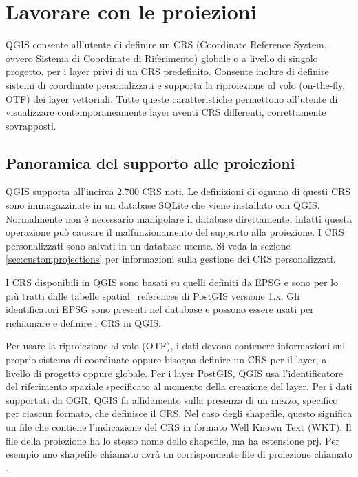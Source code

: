 
\chapter{Lavorare con le proiezioni}\label{label_projections}


QGIS consente all'utente di definire un CRS (Coordinate Reference System, ovvero Sistema di Coordinate di Riferimento) 
globale o a livello di singolo progetto, per i layer privi di un CRS predefinito. Consente inoltre di definire sistemi 
di coordinate personalizzati e supporta la riproiezione al volo (on-the-fly, OTF) dei layer vettoriali. Tutte queste 
caratteristiche permettono all'utente di visualizzare contemporaneamente layer aventi CRS differenti, correttamente 
sovrapposti.

\section{Panoramica del supporto alle proiezioni}\label{label_projoverview}

QGIS supporta all'incirca 2.700 CRS noti. Le definizioni di ognuno di questi CRS sono immagazzinate in un database SQLite 
che viene installato con QGIS. Normalmente non è necessario manipolare il database direttamente, infatti questa operazione 
può causare il malfunzionamento del supporto alla proiezione. I CRS personalizzati sono salvati in un database utente.
Si veda la sezione \ref{sec:customprojections} per informazioni sulla gestione dei CRS personalizzati.

I CRS disponibili in QGIS sono basati su quelli definiti da EPSG e sono per lo più tratti dalle tabelle 
spatial\_references di PostGIS versione 1.x. Gli identificatori EPSG sono presenti nel database e 
possono essere usati per richiamare e definire i CRS in QGIS.

Per usare la riproiezione al volo (OTF), i dati devono contenere informazioni sul proprio sistema di
coordinate oppure bisogna definire un CRS per il layer, a livello di progetto oppure globale. Per i layer 
PostGIS, QGIS usa l'identificatore del riferimento spaziale specificato al momento della creazione del layer.
Per i dati supportati da OGR, QGIS fa affidamento sulla presenza di un mezzo, specifico per ciascun formato, 
che definisce il CRS. Nel caso degli shapefile, questo significa un file che contiene l'indicazione del CRS 
in formato Well Known Text (WKT). Il file della proiezione ha lo stesso nome dello shapefile, ma 
ha estensione prj. Per esempio uno shapefile chiamato  avrà un corrispondente file 
di proiezione chiamato .

